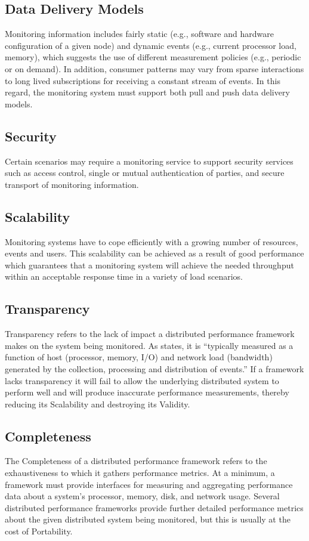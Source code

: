 \subsection{Data Delivery Models}
Monitoring information includes fairly static (e.g., software and hardware configuration of a given node) and dynamic events (e.g., current processor load, memory), which suggests the use of different measurement policies (e.g., periodic or on demand). In addition, consumer patterns may vary from sparse interactions to long lived subscriptions for receiving a constant stream of events. In this regard, the monitoring system must support both pull and push data delivery models. \cite{zanikolas2005}

\subsection{Security}
Certain scenarios may require a monitoring service to support security services such as access control, single or mutual authentication of parties, and secure transport of monitoring information. \cite{zanikolas2005}

\subsection{Scalability}
Monitoring systems have to cope efficiently with a growing number of resources, events and users. This scalability can be achieved as a result of good performance which guarantees that a monitoring system will achieve the needed throughput within an acceptable response time in a variety of load scenarios. \cite{zanikolas2005}

\subsection{Transparency}
Transparency refers to the lack of impact a distributed performance framework makes on the system being monitored. As \cite{zanikolas2005} states, it is ``typically measured as a function of host (processor, memory, I/O) and network load (bandwidth) generated by the collection, processing and distribution of events.'' If a framework lacks transparency it will fail to allow the underlying distributed system to perform well and will produce inaccurate performance measurements, thereby reducing its Scalability and destroying its Validity.

\subsection{Completeness}
The Completeness of a distributed performance framework refers to the exhaustiveness to which it gathers performance metrics. At a minimum, a framework must provide interfaces for measuring and aggregating performance data about a system's processor, memory, disk, and network usage. Several distributed performance frameworks provide further detailed performance metrics about the given distributed system being monitored, but this is usually at the cost of Portability.

